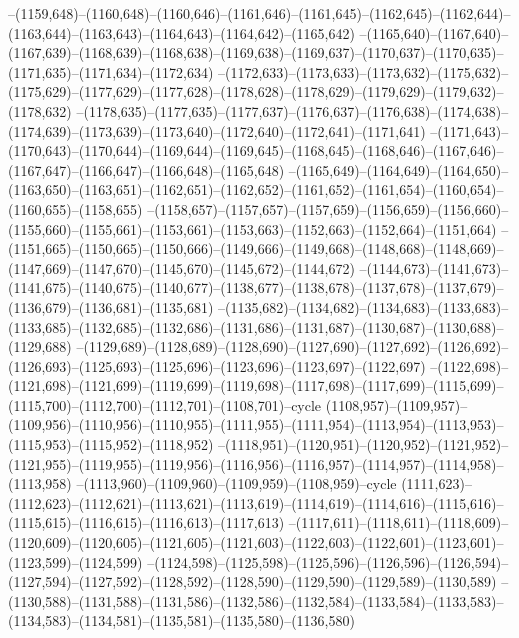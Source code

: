 --(1159,648)--(1160,648)--(1160,646)--(1161,646)--(1161,645)--(1162,645)--(1162,644)--(1163,644)--(1163,643)--(1164,643)--(1164,642)--(1165,642)
--(1165,640)--(1167,640)--(1167,639)--(1168,639)--(1168,638)--(1169,638)--(1169,637)--(1170,637)--(1170,635)--(1171,635)--(1171,634)--(1172,634)
--(1172,633)--(1173,633)--(1173,632)--(1175,632)--(1175,629)--(1177,629)--(1177,628)--(1178,628)--(1178,629)--(1179,629)--(1179,632)--(1178,632)
--(1178,635)--(1177,635)--(1177,637)--(1176,637)--(1176,638)--(1174,638)--(1174,639)--(1173,639)--(1173,640)--(1172,640)--(1172,641)--(1171,641)
--(1171,643)--(1170,643)--(1170,644)--(1169,644)--(1169,645)--(1168,645)--(1168,646)--(1167,646)--(1167,647)--(1166,647)--(1166,648)--(1165,648)
--(1165,649)--(1164,649)--(1164,650)--(1163,650)--(1163,651)--(1162,651)--(1162,652)--(1161,652)--(1161,654)--(1160,654)--(1160,655)--(1158,655)
--(1158,657)--(1157,657)--(1157,659)--(1156,659)--(1156,660)--(1155,660)--(1155,661)--(1153,661)--(1153,663)--(1152,663)--(1152,664)--(1151,664)
--(1151,665)--(1150,665)--(1150,666)--(1149,666)--(1149,668)--(1148,668)--(1148,669)--(1147,669)--(1147,670)--(1145,670)--(1145,672)--(1144,672)
--(1144,673)--(1141,673)--(1141,675)--(1140,675)--(1140,677)--(1138,677)--(1138,678)--(1137,678)--(1137,679)--(1136,679)--(1136,681)--(1135,681)
--(1135,682)--(1134,682)--(1134,683)--(1133,683)--(1133,685)--(1132,685)--(1132,686)--(1131,686)--(1131,687)--(1130,687)--(1130,688)--(1129,688)
--(1129,689)--(1128,689)--(1128,690)--(1127,690)--(1127,692)--(1126,692)--(1126,693)--(1125,693)--(1125,696)--(1123,696)--(1123,697)--(1122,697)
--(1122,698)--(1121,698)--(1121,699)--(1119,699)--(1119,698)--(1117,698)--(1117,699)--(1115,699)--(1115,700)--(1112,700)--(1112,701)--(1108,701)--cycle
(1108,957)--(1109,957)--(1109,956)--(1110,956)--(1110,955)--(1111,955)--(1111,954)--(1113,954)--(1113,953)--(1115,953)--(1115,952)--(1118,952)
--(1118,951)--(1120,951)--(1120,952)--(1121,952)--(1121,955)--(1119,955)--(1119,956)--(1116,956)--(1116,957)--(1114,957)--(1114,958)--(1113,958)
--(1113,960)--(1109,960)--(1109,959)--(1108,959)--cycle
(1111,623)--(1112,623)--(1112,621)--(1113,621)--(1113,619)--(1114,619)--(1114,616)--(1115,616)--(1115,615)--(1116,615)--(1116,613)--(1117,613)
--(1117,611)--(1118,611)--(1118,609)--(1120,609)--(1120,605)--(1121,605)--(1121,603)--(1122,603)--(1122,601)--(1123,601)--(1123,599)--(1124,599)
--(1124,598)--(1125,598)--(1125,596)--(1126,596)--(1126,594)--(1127,594)--(1127,592)--(1128,592)--(1128,590)--(1129,590)--(1129,589)--(1130,589)
--(1130,588)--(1131,588)--(1131,586)--(1132,586)--(1132,584)--(1133,584)--(1133,583)--(1134,583)--(1134,581)--(1135,581)--(1135,580)--(1136,580)
